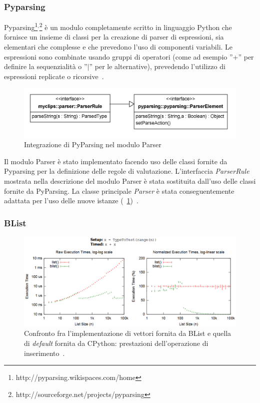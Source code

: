 \subsubsection{Pyparsing}
Pyparsing\footnote{http://pyparsing.wikispaces.com/home}$^,$\footnote{http://sourceforge.net/projects/pyparsing} è un modulo completamente scritto in linguaggio Python che fornisce un insieme di classi per la creazione di parser di espressioni, sia elementari che complesse e che prevedono l'uso di componenti variabili. Le espressioni sono combinate usando gruppi di operatori (come ad esempio ''+'' per definire la sequenzialità o ''$\mid$'' per le alternative), prevedendo l'utilizzo di espressioni replicate o ricorsive~\cite{pyparsing-gs}.

\begin{figure}[h]
\centering
\includegraphics[width=1\textwidth]{Immagini/Capitolo3/Classi/myclips_parser_PyParsing.png}
\caption[Integrazione di PyParsing nel modulo Parser]{Integrazione di PyParsing nel modulo Parser}\label{fig:class-myclips-parser-pyparsing}
\end{figure}

Il modulo Parser è stato implementato facendo uso delle classi fornite da Pyparsing per la definizione delle regole di valutazione. L'interfaccia \emph{ParserRule} mostrata nella descrizione del modulo Parser è stata sostituita dall'uso delle classi fornite da PyParsing. La classe principale \emph{Parser} è stata conseguentemente adattata per l'uso delle nuove istanze (\figurename~\ref{fig:class-myclips-parser-pyparsing})~\cite{pyparsing-apidoc}.

\subsubsection{BList}

\begin{figure}[h]
\centering
\includegraphics[width=1\textwidth]{Immagini/Capitolo3/BList-comparison.pdf}
\caption[Confronto fra l'implementazione di vettori fornita da BList e di \emph{default}]{Confronto fra l'implementazione di vettori fornita da BList e quella di \emph{default} fornita da CPython: prestazioni dell'operazione di inserimento~\cite{blist-prest}.}\label{fig:blist-comparison}
\end{figure}

